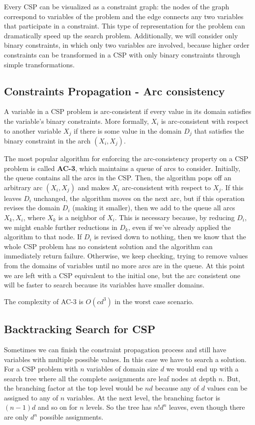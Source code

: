 \documentclass{article}
\begin{document}
Every CSP can be visualized as a constraint graph: the nodes of the graph correspond to variables of the problem and the edge connects any two variables that participate in a constraint. This type of representation for the problem can dramatically speed up the search problem. Additionally, we will consider only binary constraints, in which only two variables are involved, because higher order constraints can be transformed in a CSP with only binary constraints through simple transformations.

\subsection{Constraints Propagation - Arc consistency}
A variable in a CSP problem is arc-consistent if every value in its domain satisfies the variable's binary constraints. More formally, \(X_i\) is arc-consistent with respect to another variable \(X_j\) if there is some value in the domain \(D_j\) that satisfies the binary constraint in the arch \((X_i, X_j)\).

The most popular algorithm for enforcing the arc-consistency property on a CSP problem is called \textbf{AC-3}, which maintains a queue of arcs to consider. Initially, the queue contains all the arcs in the CSP. Then, the algorithm pops off an arbitrary arc \((X_i, X_j)\) and makes \(X_i\) arc-consistent with respect to \(X_j\). If this leaves \(D_i\) unchanged, the algorithm moves on the next arc, but if this operation revises the domain \(D_i\) (making it smaller), then we add to the queue all arcs \(X_k, X_i\), where \(X_k\) is a neighbor of \(X_i\). This is necessary because, by reducing \(D_i\), we might enable further reductions in \(D_k\), even if we've already applied the algorithm to that node. If \(D_i\) is revised down to nothing, then we know that the whole CSP problem has no consistent solution and the algorithm can immediately return failure. Otherwise, we keep checking, trying to remove values from the domains of variables until no more arcs are in the queue. At this point we are left with a CSP equivalent to the initial one, but the arc consistent one will be faster to search because its variables have smaller domains.

The complexity of AC-3 is \(O(cd^3)\) in the worst case scenario.

\subsection{Backtracking Search for CSP}
Sometimes we can finish the constraint propagation process and still have variables with multiple possible values. In this case we have to search a solution. For a CSP problem with \(n\) variables of domain size \(d\) we would end up with a search tree where all the complete assignments are leaf nodes at depth \(n\). But, the branching factor at the top level would be \(nd\) because any of \(d\) values can be assigned to any of \(n\) variables. At the next level, the branching factor is \((n-1)d\) and so on for \(n\) levels. So the tree has \(n!d^n\) leaves, even though there are only \(d^n\) possible assignments.
\end{document}
